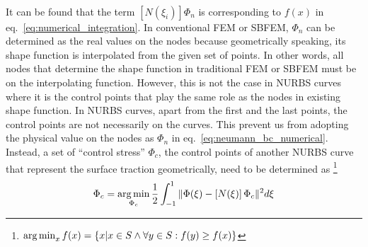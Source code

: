 \paragraph{}
It can be found that the term $[N(\xi_i)] \Phi_n$ is corresponding to $f(x)$ in eq.~\ref{eq:numerical_integration}.
In conventional FEM or SBFEM, $\Phi_n$ can be determined as the real values on the nodes because geometrically speaking,
    its shape function is interpolated from the given set of points.
In other words, all nodes that determine the shape function in traditional FEM or SBFEM must be on the interpolating function.
However, this is not the case in NURBS curves where it is the control points that play the same role as the nodes in existing
    shape function.
In NURBS curves, apart from the first and the last points, the control points are not necessarily on the curves.
This prevent us from adopting the physical value on the nodes as $\Phi_n$ in eq.~\ref{eq:neumann_bc_numerical}.
Instead, a set of ``control stress'' $\Phi_c$, the control points of another NURBS curve that represent the surface traction
    geometrically, need to be determined as \footnote{$\operatorname*{arg\,min}_x f(x) = \left\{
        x | x \in S \wedge \forall y \in S : f(y) \geq f(x)
    \right\}$}
    \begin{equation}
        \Phi_c = \operatorname*{arg\,min}_{\Phi_c}
            \frac{1}{2}
            \int_{-1}^1
            \|
                \Phi(\xi)-
                    \left[ N(\xi) \right]
                    \Phi_c
            \|^2
            d\xi            
    \label{eq:surface_traction_fitting}
    \end{equation}

